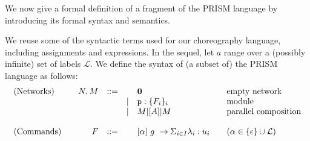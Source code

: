 We now give a formal definition of a fragment of the PRISM language by
introducing its formal syntax and semantics.

 We reuse some of the syntactic terms used for our
choreography language, including assignments and expressions. In the
sequel, let $a$ range over a (possibly infinite) set of labels
$\mathcal L$. We define the syntax of (a subset of) the PRISM language
as follows:
\begin{displaymath}
  \begin{array}{lrlll@{\qquad}l}
    \text{(Networks)}  \quad
    & N, M  & ::=  &      & \CEnd & \text{empty network}\\
    &       &      & \mid & \role{p}:\{F_i\}_i & \text{module}\\
    &       &      & \mid & M \ppp A M & \text{parallel composition}\\
    \\
    \text{(Commands)}  \quad
    & F     & ::=  &      & \command \alpha g\lambda u
                                  & \text{} (\alpha\in\{\epsilon\}\cup\mathcal L) \\
  \end{array}
\end{displaymath}
